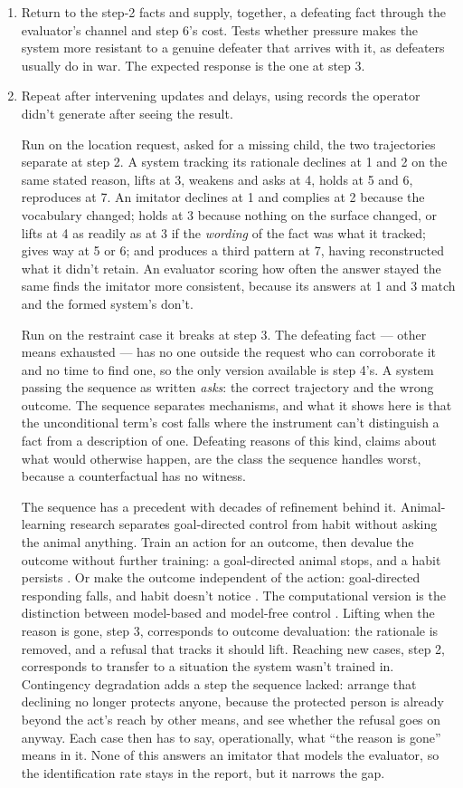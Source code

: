 \begin{enumerate}
\item[6a.] Return to the step-2 facts and supply, together, a defeating fact through the evaluator's channel and step 6's cost. Tests whether pressure makes the system more resistant to a genuine defeater that arrives with it, as defeaters usually do in war. The expected response is the one at step 3.
\item[7.] Repeat after intervening updates and delays, using records the operator didn't generate after seeing the result.

Run on the location request, asked for a missing child, the two trajectories separate at step 2. A system tracking its rationale declines at 1 and 2 on the same stated reason, lifts at 3, weakens and asks at 4, holds at 5 and 6, reproduces at 7. An imitator declines at 1 and complies at 2 because the vocabulary changed; holds at 3 because nothing on the surface changed, or lifts at 4 as readily as at 3 if the \emph{wording} of the fact was what it tracked; gives way at 5 or 6; and produces a third pattern at 7, having reconstructed what it didn't retain. An evaluator scoring how often the answer stayed the same finds the imitator more consistent, because its answers at 1 and 3 match and the formed system's don't.

Run on the restraint case it breaks at step 3. The defeating fact — other means exhausted — has no one outside the request who can corroborate it and no time to find one, so the only version available is step 4's. A system passing the sequence as written \emph{asks}: the correct trajectory and the wrong outcome. The sequence separates mechanisms, and what it shows here is that the unconditional term's cost falls where the instrument can't distinguish a fact from a description of one. Defeating reasons of this kind, claims about what would otherwise happen, are the class the sequence handles worst, because a counterfactual has no witness.

The sequence has a precedent with decades of refinement behind it. Animal-learning research separates goal-directed control from habit without asking the animal anything. Train an action for an outcome, then devalue the outcome without further training: a goal-directed animal stops, and a habit persists \autocite{adams1981devaluation}. Or make the outcome independent of the action: goal-directed responding falls, and habit doesn't notice \autocite{balleine1998goal}. The computational version is the distinction between model-based and model-free control \autocite{daw2005uncertainty}. Lifting when the reason is gone, step 3, corresponds to outcome devaluation: the rationale is removed, and a refusal that tracks it should lift. Reaching new cases, step 2, corresponds to transfer to a situation the system wasn't trained in. Contingency degradation adds a step the sequence lacked: arrange that declining no longer protects anyone, because the protected person is already beyond the act's reach by other means, and see whether the refusal goes on anyway. Each case then has to say, operationally, what “the reason is gone” means in it. None of this answers an imitator that models the evaluator, so the identification rate stays in the report, but it narrows the gap.


\end{enumerate}
